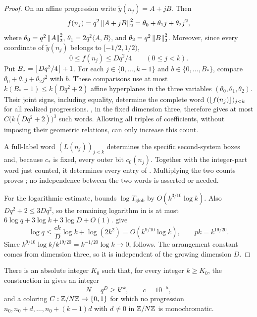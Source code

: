 \begin{proof}
On an affine progression write $\tilde y(n_j)=A+jB$.  Then
\[
 f(n_j)=q^2\left\lVert A+jB\right\rVert_2^2
       =\theta_0+\theta_1j+\theta_2j^2,
\]
where
$\theta_0=q^2\left\lVert A\right\rVert_2^2$,
$\theta_1=2q^2\langle A,B\rangle$, and
$\theta_2=q^2\left\lVert B\right\rVert_2^2$.
Moreover, since every coordinate of $\tilde y(n_j)$ belongs to
$[-1/2,1/2)$,
\[
 0\le f(n_j)\le Dq^2/4\qquad(0\le j<k).
\]
Put $B_*=\left\lfloor Dq^2/4\right\rfloor+1$.  For each $j\in\{0,\ldots,k-1\}$ and
$b\in\{0,\ldots,B_*\}$, compare
$\theta_0+\theta_1j+\theta_2j^2$ with $b$.  These comparisons use at
most $k(B_*+1)\le k(Dq^2+2)$ affine hyperplanes in the three variables
$(\theta_0,\theta_1,\theta_2)$.  Their joint signs, including equality,
determine the complete word $(\left\lfloor f(n_j)\right\rfloor)_{j<k}$ for all realized
progressions.  , in the fixed dimension three,
therefore gives at most $C\bigl(k(Dq^2+2)\bigr)^3$ such words.  Allowing
all triples of coefficients, without imposing their geometric
relations, can only increase this count.

A full-label word $(L(n_j))_{j<k}$ determines the specific second-system
boxes and, because $c_*$ is fixed, every outer bit $c_0(n_j)$.  Together
with the integer-part word just counted, it determines every entry of
.  Multiplying the two counts proves
; no independence between the two words
is asserted or needed.

For the logarithmic estimate,  bounds
$\log T_{\mathrm{glob}}$ by $O(k^{3/10}\log k)$.  Also
$Dq^2+2\le3Dq^2$, so the remaining logarithm in
 is at most
$6\log q+3\log k+3\log D+O(1)$.
 give
\[
 \log q\le \frac{ck}{D}\log k+\log(2k^2)
          =O(k^{9/10}\log k),
 \qquad pk=k^{19/20}.
\]
Since $k^{9/10}\log k/k^{19/20}=k^{-1/20}\log k\to0$,
 follows.  The arrangement constant comes from
dimension three, so it is independent of the growing dimension $D$.
\end{proof}

\begin{theorem}\label{perturb:cyclic}
There is an absolute integer $K_0$ such that, for every integer
$k\ge K_0$, the construction in  gives an integer
\[
 N=q^D\ge k^{ck},\qquad c=10^{-5},
\]
and a coloring $C:\mathbb Z/N\mathbb Z\to\{0,1\}$ for which no progression
$n_0,n_0+d,\ldots,n_0+(k-1)d$ with $d\ne0$ in $\mathbb Z/N\mathbb Z$ is
monochromatic.
\end{theorem}

